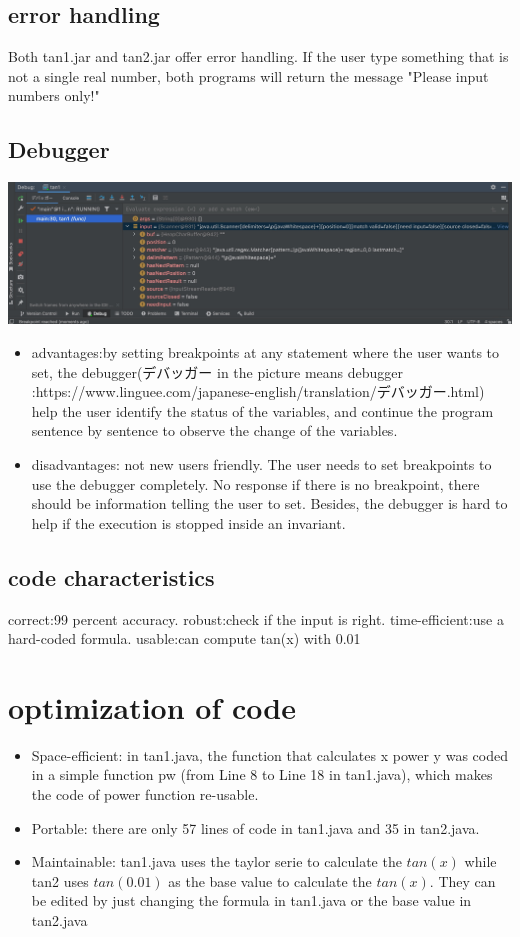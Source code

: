 \documentclass[10pt,a4paper,twoside]{article}
\begin{document}
\subsection{error handling}
    Both tan1.jar and tan2.jar offer error handling. If the user type something that is not a single real number, both programs will return the message "Please input numbers only!"
\subsection{Debugger}
\includegraphics[scale=0.15]{debugger.png}
\begin{itemize}
    \item advantages:by setting breakpoints at any statement where the user wants to set, the debugger(デバッガー in the picture means debugger :https://www.linguee.com/japanese-english/translation/デバッガー.html) help the user identify the status of the variables, and continue the program sentence by sentence to observe the change of the variables.
    
    \item disadvantages: not new users friendly. The user needs to set breakpoints to use the debugger completely. No response if there is no breakpoint, there should be information telling the user to set.
    Besides, the debugger is hard to help if the execution is stopped inside an invariant.
\end{itemize}


\subsection{code characteristics}
correct:99 percent accuracy.
robust:check if the input is right.
time-efficient:use a hard-coded formula.
usable:can compute tan(x) with 0.01
\section{optimization of code}
\begin{itemize}
    \item Space-efficient: in tan1.java, the function that calculates x power y was coded in a simple function pw (from Line 8 to Line 18 in tan1.java), which makes the code of power function re-usable.
    \item Portable: there are only 57 lines of code in tan1.java and 35 in tan2.java.
    \item Maintainable: tan1.java uses the taylor serie to calculate the $tan(x)$ while tan2 uses $tan(0.01)$ as the base value to calculate the $tan(x)$. They can be edited by just changing the formula in tan1.java or the base value in tan2.java 
\end{itemize}
\end{document}
